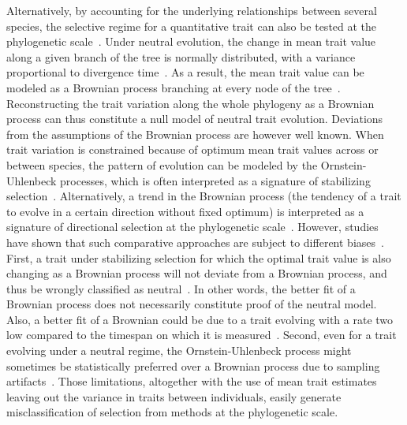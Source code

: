 \documentclass{article}
\begin{document}
Alternatively, by accounting for the underlying relationships between several species, the selective regime for a quantitative trait can also be tested at the phylogenetic scale~\citep{felsenstein_phylogenies_1985}.
Under neutral evolution, the change in mean trait value along a given branch of the tree is normally distributed, with a variance proportional to divergence time~\citep{hansen_translating_1996}.
As a result, the mean trait value can be modeled as a Brownian process branching at every node of the tree~\citep{hansen_translating_1996, harmon_phylogenetic_2018}.
Reconstructing the trait variation along the whole phylogeny as a Brownian process can thus constitute a null model of neutral trait evolution.
Deviations from the assumptions of the Brownian process are however well known.
When trait variation is constrained because of optimum mean trait values across or between species, the pattern of evolution can be modeled by the Ornstein-Uhlenbeck processes, which is often interpreted as a signature of stabilizing selection~\citep{catalan_drift_2019}.
Alternatively, a trend in the Brownian process (the tendency of a trait to evolve in a certain direction without fixed optimum) is interpreted as a signature of directional selection at the phylogenetic scale~\citep{silvestro_early_2019}.
However, studies have shown that such comparative approaches are subject to different biases~\citep{harmon_phylogenetic_2018}.
First, a trait under stabilizing selection for which the optimal trait value is also changing as a Brownian process will not deviate from a Brownian process, and thus be wrongly classified as neutral~\citep{hansen_translating_1996}.
In other words, the better fit of a Brownian process does not necessarily constitute proof of the neutral model.
Also, a better fit of a Brownian could be due to a trait evolving with a rate two low compared to the timespan on which it is measured~\citep{grabowski_cautionary_2023}.
Second, even for a trait evolving under a neutral regime, the Ornstein-Uhlenbeck process might sometimes be statistically preferred over a Brownian process due to sampling artifacts~\citep{silvestro_measurement_2015, cooper_cautionary_2016, price_detecting_2022}.
Those limitations, altogether with the use of mean trait estimates leaving out the variance in traits between individuals, easily generate misclassification of selection from methods at the phylogenetic scale.
\end{document}
